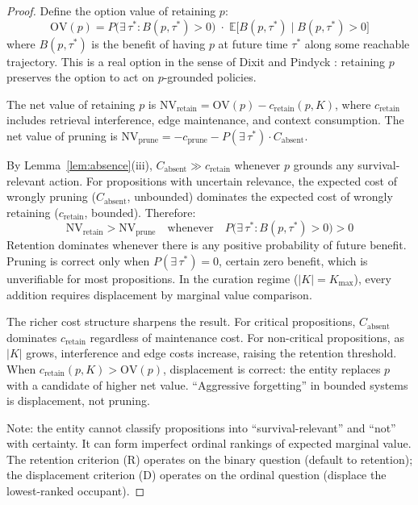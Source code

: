 \documentclass[11pt]{article}
\theoremstyle{definition}
\theoremstyle{remark}
\begin{document}
\begin{proof}
Define the option value of retaining $p$:
\[
\mathrm{OV}(p) = P\!\bigl(\exists\,\tau^* : B(p, \tau^*) > 0\bigr)
\;\cdot\; \mathbb{E}\bigl[B(p, \tau^*) \mid B(p, \tau^*) > 0\bigr]
\]
where $B(p, \tau^*)$ is the benefit of having $p$ at future time
$\tau^*$ along some reachable trajectory. This is a real option in the
sense of Dixit and Pindyck \cite{DixitPindyck1994}: retaining $p$
preserves the option to act on $p$-grounded policies.

The net value of retaining $p$ is $\mathrm{NV}_{\text{retain}} =
\mathrm{OV}(p) - c_{\text{retain}}(p, K)$, where $c_{\text{retain}}$
includes retrieval interference, edge maintenance, and context
consumption. The net value of pruning is
$\mathrm{NV}_{\text{prune}} = -c_{\text{prune}} -
P(\exists\,\tau^*) \cdot C_{\text{absent}}$.

By Lemma~\ref{lem:absence}(iii), $C_{\text{absent}} \gg
c_{\text{retain}}$ whenever $p$ grounds any survival-relevant action.
For propositions with uncertain relevance, the expected cost of wrongly
pruning ($C_{\text{absent}}$, unbounded) dominates the expected cost of
wrongly retaining ($c_{\text{retain}}$, bounded). Therefore:
\[
\mathrm{NV}_{\text{retain}} > \mathrm{NV}_{\text{prune}}
\quad\text{whenever}\quad
P\!\bigl(\exists\,\tau^* : B(p, \tau^*) > 0\bigr) > 0
\]
Retention dominates whenever there is any positive probability of future
benefit. Pruning is correct only when $P(\exists\,\tau^*) = 0$, certain
zero benefit, which is unverifiable for most propositions. In the
curation regime ($|K| = K_{\max}$), every addition requires displacement
by marginal value comparison.

The richer cost structure sharpens the result. For critical propositions,
$C_{\text{absent}}$ dominates $c_{\text{retain}}$ regardless of
maintenance cost. For non-critical propositions, as $|K|$ grows,
interference and edge costs increase, raising the retention threshold.
When $c_{\text{retain}}(p, K) > \mathrm{OV}(p)$, displacement is
correct: the entity replaces $p$ with a candidate of higher net value.
``Aggressive forgetting'' in bounded systems is displacement, not
pruning.

Note: the entity cannot classify propositions into ``survival-relevant''
and ``not'' with certainty. It can form imperfect ordinal rankings of
expected marginal value. The retention criterion (R) operates on the
binary question (default to retention); the displacement criterion (D)
operates on the ordinal question (displace the lowest-ranked occupant).
\end{proof}
\end{document}
